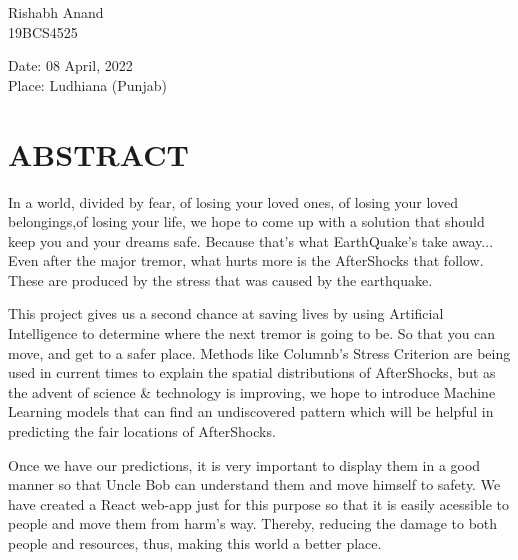 \documentclass[14pt]{extarticle}
\newcommand\mainmatter{
    \cleardoublepage
    \pagenumbering{arabic}
}
\begin{document}
\vspace{5em}
\begin{flushright}
    Rishabh Anand\\
    19BCS4525
\end{flushright}

\vspace{13em}
Date: 08 April, 2022 \\

Place: Ludhiana (Punjab)\\

\newpage
{}
\listoffigures

\newpage
{}
\section*{ABSTRACT}
\onehalfspacing
\setlength{\parskip}{0em}
In a world, divided by fear, of losing your loved ones, of losing your loved belongings,of
losing your life, we hope to come up with a solution that should keep you and your dreams
safe. Because that's what EarthQuake's take away... Even after the major tremor, what
hurts more is the AfterShocks that follow. These are produced by the stress that was caused
by the earthquake.

This project gives us a second chance at saving lives by using Artificial Intelligence
to determine where the next tremor is going to be. So that you can move, and get to a
safer place. Methods like Columnb's Stress Criterion are being used in current times to
explain the spatial distributions of AfterShocks, but as the advent of science \& technology
is improving, we hope to introduce Machine Learning models that can find an undiscovered
pattern which will be helpful in predicting the fair locations of AfterShocks.

Once we have our predictions, it is very important to display them in a good manner so
that Uncle Bob can understand them and move himself to safety. We have created a React
web-app just for this purpose so that it is easily acessible to people and move them from
harm's way. Thereby, reducing the damage to both people and resources, thus, making
this world a better place.

\newpage
{}
\begin{center}
    \tableofcontents
\end{center}

\mainmatter
\end{document}
